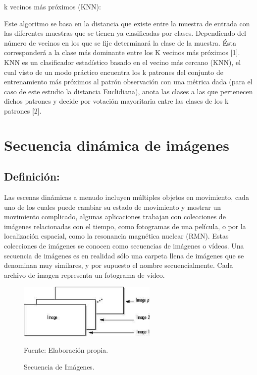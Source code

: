 \begin{enumerate}
{\bf \item k vecinos más próximos (KNN):} \skip 0.1cm
Este algoritmo se basa en la distancia que existe entre la muestra de entrada con las diferentes muestras que se tienen ya clasificadas por clases. Dependiendo del número de vecinos en los que se fije determinará la clase de la muestra. Ésta corresponderá a la clase más dominante entre los K vecinos más próximos [1]. 
\vskip 0.1cm
KNN es un clasificador estadístico basado en el vecino más cercano (KNN), el cual visto de un modo práctico encuentra los k patrones del conjunto de entrenamiento más próximos al patrón observación con una métrica dada (para el caso de este estudio la distancia Euclidiana), anota las clases a las que pertenecen dichos patrones y decide por votación mayoritaria entre las clases de los k patrones [2].
\end{enumerate}

\section{Secuencia dinámica de imágenes}
\subsection{Definición:}
Las escenas dinámicas a menudo incluyen múltiples objetos en movimiento, cada uno de los cuales puede cambiar su estado de movimiento y mostrar un movimiento complicado, algunas aplicaciones trabajan con colecciones de imágenes relacionadas con el tiempo, como fotogramas de una película, o por la localización espacial, como la resonancia magnética nuclear (RMN). Estas colecciones de imágenes se conocen como secuencias de imágenes o vídeos.
\vskip 0.1cm
Una secuencia de imágenes es en realidad sólo una carpeta llena de imágenes que se denominan muy similares, y por supuesto el nombre secuencialmente. Cada archivo de imagen representa un fotograma de vídeo.

\begin{figure}[ht]
\begin{center}
\includegraphics[width=0.6\textwidth]{Imagen25}
\end{center}
\begin{center}
\vskip -0.5cm
\caption{\small{Secuencia de Imágenes.}}
{\small{Fuente: Elaboración propia.}}
\end{center}
\end{figure}


